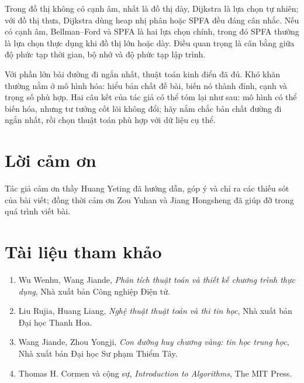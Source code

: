 \documentclass[11pt]{article}
\begin{document}
Trong đồ thị không có cạnh âm, nhất là đồ thị dày, Dijkstra là lựa chọn tự
nhiên; với đồ thị thưa, Dijkstra dùng heap nhị phân hoặc SPFA đều đáng cân
nhắc. Nếu có cạnh âm, Bellman--Ford và SPFA là hai lựa chọn chính, trong đó
SPFA thường là lựa chọn thực dụng khi đồ thị lớn hoặc dày. Điều quan trọng là
cân bằng giữa độ phức tạp thời gian, bộ nhớ và độ phức tạp lập trình.

Với phần lớn bài đường đi ngắn nhất, thuật toán kinh điển đã đủ. Khó khăn
thường nằm ở mô hình hóa: hiểu bản chất đề bài, biến nó thành đỉnh, cạnh và
trọng số phù hợp. Hai câu kết của tác giả có thể tóm lại như sau: mô hình có
thể biến hóa, nhưng tư tưởng cốt lõi không đổi; hãy nắm chắc bản chất đường đi
ngắn nhất, rồi chọn thuật toán phù hợp với dữ liệu cụ thể.

\section*{Lời cảm ơn}

Tác giả cảm ơn thầy Huang Yeting đã hướng dẫn, góp ý và chỉ ra các thiếu sót
của bài viết; đồng thời cảm ơn Zou Yuhan và Jiang Hongsheng đã giúp đỡ trong
quá trình viết bài.

\section*{Tài liệu tham khảo}

\begin{enumerate}
  \item Wu Wenhu, Wang Jiande, \textit{Phân tích thuật toán và thiết kế chương
  trình thực dụng}, Nhà xuất bản Công nghiệp Điện tử.
  \item Liu Rujia, Huang Liang, \textit{Nghệ thuật thuật toán và thi tin học},
  Nhà xuất bản Đại học Thanh Hoa.
  \item Wang Jiande, Zhou Yongji, \textit{Con đường huy chương vàng: tin học
  trung học}, Nhà xuất bản Đại học Sư phạm Thiểm Tây.
  \item Thomas H. Cormen và cộng sự, \textit{Introduction to Algorithms}, The
  MIT Press.
\end{enumerate}
\end{document}
